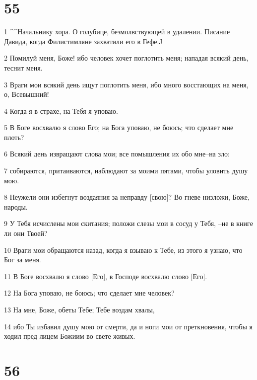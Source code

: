 \chapter{55}

\par 1 ^^Начальнику хора. О голубице, безмолвствующей в удалении. Писание Давида, когда Филистимляне захватили его в Гефе.^^
\par 2 Помилуй меня, Боже! ибо человек хочет поглотить меня; нападая всякий день, теснит меня.
\par 3 Враги мои всякий день ищут поглотить меня, ибо много восстающих на меня, о, Всевышний!
\par 4 Когда я в страхе, на Тебя я уповаю.
\par 5 В Боге восхвалю я слово Его; на Бога уповаю, не боюсь; что сделает мне плоть?
\par 6 Всякий день извращают слова мои; все помышления их обо мне--на зло:
\par 7 собираются, притаиваются, наблюдают за моими пятами, чтобы уловить душу мою.
\par 8 Неужели они избегнут воздаяния за неправду [свою]? Во гневе низложи, Боже, народы.
\par 9 У Тебя исчислены мои скитания; положи слезы мои в сосуд у Тебя, --не в книге ли они Твоей?
\par 10 Враги мои обращаются назад, когда я взываю к Тебе, из этого я узнаю, что Бог за меня.
\par 11 В Боге восхвалю я слово [Его], в Господе восхвалю слово [Его].
\par 12 На Бога уповаю, не боюсь; что сделает мне человек?
\par 13 На мне, Боже, обеты Тебе; Тебе воздам хвалы,
\par 14 ибо Ты избавил душу мою от смерти, да и ноги мои от преткновения, чтобы я ходил пред лицем Божиим во свете живых.

\chapter{56}

